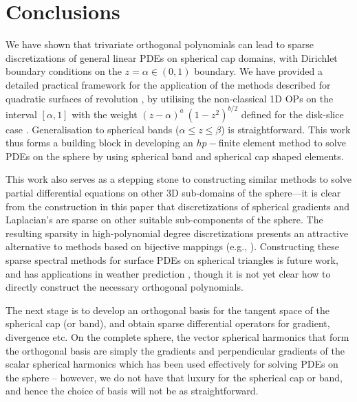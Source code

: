 \documentclass[11pt, oneside]{article}   	%
\begin{document}
\section{Conclusions}

We have shown that trivariate orthogonal polynomials can lead to sparse discretizations of general linear PDEs on spherical cap domains, with Dirichlet boundary conditions on the $z = \alpha \in (0,1)$ boundary. We have provided a detailed practical framework for the application of the methods described for quadratic surfaces of revolution \cite{olver2020orthogonal}, by utilising the non-classical 1D OPs on the interval $[\alpha, 1]$ with the weight $(z - \alpha)^a \: (1-z^2)^{b/2}$ defined for the disk-slice case \cite{snowball2019sparse}. Generalisation to spherical bands ($\alpha \leq z \leq \beta$) is straightforward.  This work thus forms a building block in developing an $hp-$finite element method to solve PDEs on the sphere by using spherical band and spherical cap shaped elements.

This work also serves as a stepping stone to constructing similar methods to solve partial differential equations on other 3D sub-domains of the sphere---it is clear from the construction in this paper that discretizations of spherical gradients and Laplacian's are sparse on other suitable sub-components of the sphere. The resulting sparsity in high-polynomial degree discretizations presents an attractive alternative to methods based on bijective mappings (e.g., \cite{DGShallowWater,FEMShallowWater,boyd2005sphere}). Constructing these sparse spectral methods for surface PDEs on  spherical triangles is future work, and has applications in weather prediction \cite{staniforth2012horizontal}, though it is not yet clear how to directly construct the necessary orthogonal polynomials. 

The next stage is to develop an orthogonal basis for the tangent space of the spherical cap (or band), and obtain sparse differential operators for gradient, divergence etc. On the complete sphere, the vector spherical harmonics that form the orthogonal basis are simply the gradients and perpendicular gradients of the scalar spherical harmonics \cite{barrera1985vector} which has been used effectively for solving PDEs on the sphere \cite{vasil2019tensor,lecoanet2019tensor} -- however, we do not have that luxury for the spherical cap or band, and hence the choice of basis will not be as straightforward.




\end{document}
